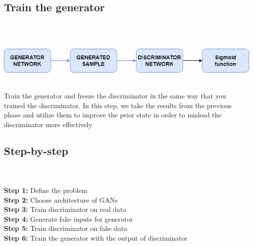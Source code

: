 \documentclass[14pt]{article}
\begin{document}
\subsection{Train the generator}
\\

\\
\begin{center}
    \includegraphics[width = 11 cm ]{6.png}
\end{center}
\\
Train the generator and freeze the discriminator in the same way that you trained the discriminator. In this step, we take the results from the previous phase and utilize them to improve the prior state in order to mislead the discriminator more effectively.
\\
\subsection{Step-by-step}
\\
\\\textbf{Step 1:} Define the problem
\\
\textbf{Step 2:} Choose architecture of GANs
\\\textbf{Step 3:} Train discriminator on real data
\\\textbf{Step 4:} Generate fake inputs for generator
\\\textbf{Step 5:} Train discriminator on fake data
\\ \textbf{Step 6:} Train the generator with the output of discriminator
\\
\end{document}
